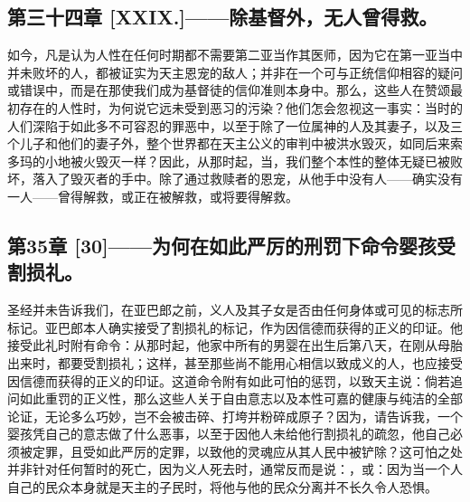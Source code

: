
\subsection{第三十四章 [XXIX.]——除基督外，无人曾得救。}

如今，凡是认为人性在任何时期都不需要第二亚当作其医师，因为它在第一亚当中并未败坏的人，都被证实为天主恩宠的敌人；并非在一个可与正统信仰相容的疑问或错误中，而是在那使我们成为基督徒的信仰准则本身中。那么，这些人在赞颂最初存在的人性时，为何说它远未受到恶习的污染？他们怎会忽视这一事实：当时的人们深陷于如此多不可容忍的罪恶中，以至于除了一位属神的人及其妻子，以及三个儿子和他们的妻子外，整个世界都在天主公义的审判中被洪水毁灭，如同后来索多玛的小地被火毁灭一样？因此，从那时起，当，我们整个本性的整体无疑已被败坏，落入了毁灭者的手中。除了通过救赎者的恩宠，从他手中没有人——确实没有一人——曾得解救，或正在被解救，或将要得解救。\par


\subsection{第35章 [30]——为何在如此严厉的刑罚下命令婴孩受割损礼。}

圣经并未告诉我们，在亚巴郎之前，义人及其子女是否由任何身体或可见的标志所标记。亚巴郎本人确实接受了割损礼的标记，作为因信德而获得的正义的印证。他接受此礼时附有命令：从那时起，他家中所有的男婴在出生后第八天，在刚从母胎出来时，都要受割损礼；这样，甚至那些尚不能用心相信以致成义的人，也应接受因信德而获得的正义的印证。这道命令附有如此可怕的惩罚，以致天主说：倘若追问如此重罚的正义性，那么这些人关于自由意志以及本性可嘉的健康与纯洁的全部论证，无论多么巧妙，岂不会被击碎、打垮并粉碎成原子？因为，请告诉我，一个婴孩凭自己的意志做了什么恶事，以至于因他人未给他行割损礼的疏忽，他自己必须被定罪，且受如此严厉的定罪，以致他的灵魂应从其人民中被铲除？这可怕之处并非针对任何暂时的死亡，因为义人死去时，通常反而是说：，或：因为当一个人自己的民众本身就是天主的子民时，将他与他的民众分离并不长久令人恐惧。\par

